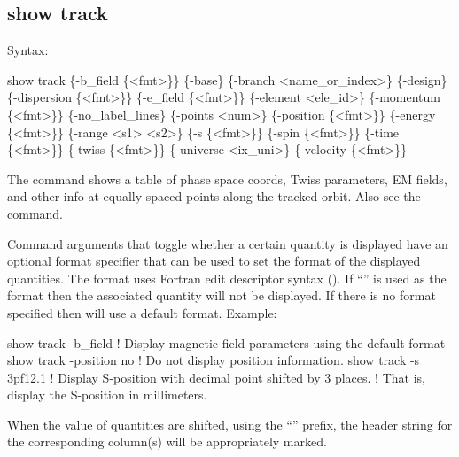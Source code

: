 {{{{{{{{{{{\vfill\break


\subsection{show track}
\label{s:show.track}

Syntax:
\begin{example}
  show track \{-b_field \{<fmt>\}\} \{-base\} \{-branch <name_or_index>\} \{-design\} 
      \{-dispersion \{<fmt>\}\} \{-e_field \{<fmt>\}\} \{-element <ele_id>\} \{-momentum \{<fmt>\}\} 
      \{-no_label_lines\} \{-points <num>\} \{-position \{<fmt>\}\} \{-energy \{<fmt>\}\} 
      \{-range <s1> <s2>\} \{-s \{<fmt>\}\} \{-spin \{<fmt>\}\} \{-time \{<fmt>\}\} 
      \{-twiss \{<fmt>\}\} \{-universe <ix_uni>\} \{-velocity \{<fmt>\}\}
\end{example}

The  command shows a table of phase space coords, Twiss parameters, EM fields, and
other info at equally spaced points along the tracked orbit. Also see the 
command.

Command arguments that toggle whether a certain quantity is displayed have an optional 
format specifier that can be used to set the format of the displayed quantities. The format uses
Fortran edit descriptor syntax (). If ``'' is used as the format then
the associated quantity will not be displayed. If there is no format specified then \tao will use
a default format. Example:
\begin{example}
  show track -b_field      ! Display magnetic field parameters using the default format
  show track -position no  ! Do not display position information.
  show track -s 3pf12.1    ! Display S-position with decimal point shifted by 3 places.
                           !   That is, display the S-position in millimeters.
\end{example}
When the value of quantities are shifted, using the ``'' prefix, the header string for the
corresponding column(s) will be appropriately marked.

}}}}}}}}}}}
